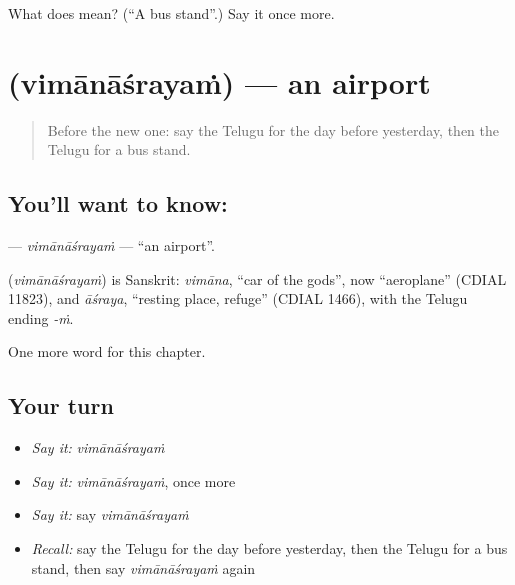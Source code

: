 \begin{tcolorbox}[breakable,colback=teal!4,colframe=teal!35!black,title={Before you move on}]
What does  mean? (\textquotedblleft{}A bus stand\textquotedblright{}.) Say it once more.
\end{tcolorbox}
\section[\texorpdfstring{\te{విమానాశ్రయం} (vimānāśrayaṁ)}{విమానాశ్రయం (vimānāśrayaṁ)}]{ (vimānāśrayaṁ) — an airport}

\label{lesson:TE-C214-vimanasrayam}



\begin{quote}
Before the new one: say the Telugu for the day before yesterday, then the Telugu for a bus stand.
\end{quote}

\subsection*{You'll want to know: }
\textbf{} — \emph{vimānāśrayaṁ} — \textquotedblleft{}an airport\textquotedblright{}.

\begin{cousinweb}
\textbf{} (\emph{vimānāśrayaṁ}) is Sanskrit: \emph{vimāna}, \textquotedblleft{}car of the gods\textquotedblright{}, now \textquotedblleft{}aeroplane\textquotedblright{} (CDIAL 11823), and \emph{āśraya}, \textquotedblleft{}resting place, refuge\textquotedblright{} (CDIAL 1466), with the Telugu ending \emph{-ṁ}.
\end{cousinweb}

\begin{grammarlens}[title={What you've built}]
One more word for this chapter.
\end{grammarlens}

\subsection*{Your turn}
\begin{itemize}
\raggedright
  \item \emph{Say it:} \emph{vimānāśrayaṁ}
  \item \emph{Say it:} \emph{vimānāśrayaṁ}, once more
  \item \emph{Say it:} say \emph{vimānāśrayaṁ}
  \item \emph{Recall:} say the Telugu for the day before yesterday, then the Telugu for a bus stand, then say \emph{vimānāśrayaṁ} again
\end{itemize}

